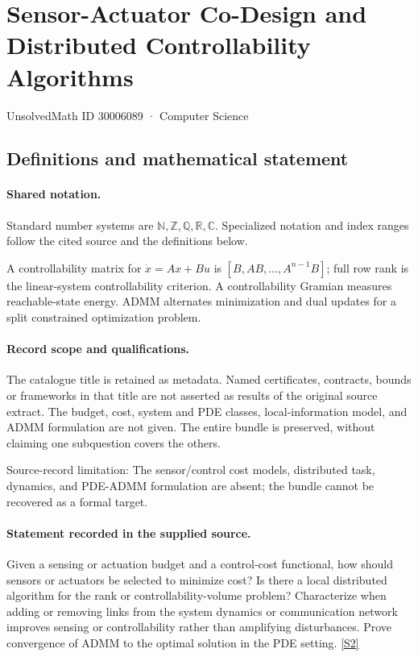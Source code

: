 \documentclass[11pt]{article}
\newcommand{\sref}[2]{\hyperlink{source:#1:#2}{[S#2]}}
\begin{document}
\setcounter{section}{30006088}
\section{Sensor-Actuator Co-Design and Distributed Controllability Algorithms}\label{30006089}
{\small\sffamily UnsolvedMath ID 30006089 · Computer Science}
\subsection{Definitions and mathematical statement}

\paragraph{Shared notation.}Standard number systems are $\mathbb N,\mathbb Z,\mathbb Q,\mathbb R,\mathbb C$. Specialized notation and index ranges follow the cited source and the definitions below.


A controllability matrix for $\dot x=Ax+Bu$ is $[B,AB,\ldots,A^{n-1}B]$; full row rank is the linear-system controllability criterion. A controllability Gramian measures reachable-state energy. ADMM alternates minimization and dual updates for a split constrained optimization problem.
\paragraph{Record scope and qualifications.}
The catalogue title is retained as metadata. Named certificates, contracts, bounds or frameworks in that title are not asserted as results of the original source extract.
The budget, cost, system and PDE classes, local-information model, and ADMM formulation are not given. The entire bundle is preserved, without claiming one subquestion covers the others.

Source-record limitation: The sensor/control cost models, distributed task, dynamics, and PDE-ADMM formulation are absent; the bundle cannot be recovered as a formal target.
\paragraph{Statement recorded in the supplied source.}
Given a sensing or actuation budget and a control-cost functional, how should sensors or actuators be selected to minimize cost? Is there a local distributed algorithm for the rank or controllability-volume problem? Characterize when adding or removing links from the system dynamics or communication network improves sensing or controllability rather than amplifying disturbances. Prove convergence of ADMM to the optimal solution in the PDE setting. \sref{30006089}{2}
\end{document}
